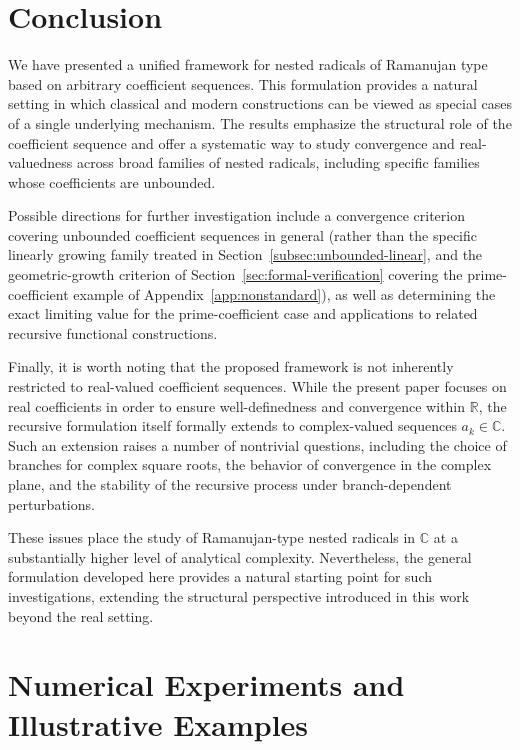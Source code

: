\documentclass[11pt,a4paper]{amsart}
\theoremstyle{plain}
\theoremstyle{definition}
\theoremstyle{remark}
\begin{document}
\section{Conclusion}

We have presented a unified framework for nested radicals of Ramanujan type based on arbitrary coefficient sequences. This formulation provides a natural setting in which classical and modern constructions can be viewed as special cases of a single underlying mechanism. The results emphasize the structural role of the coefficient sequence and offer a systematic way to study convergence and real-valuedness across broad families of nested radicals, including specific families whose coefficients are unbounded.

Possible directions for further investigation include a convergence criterion covering unbounded coefficient sequences in general (rather than the specific linearly growing family treated in Section~\ref{subsec:unbounded-linear}, and the geometric-growth criterion of Section~\ref{sec:formal-verification} covering the prime-coefficient example of Appendix~\ref{app:nonstandard}), as well as determining the exact limiting value for the prime-coefficient case and applications to related recursive functional constructions.

Finally, it is worth noting that the proposed framework is not inherently restricted to real-valued coefficient sequences. While the present paper focuses on real coefficients in order to ensure well-definedness and convergence within $\mathbb{R}$, the recursive formulation itself formally extends to complex-valued sequences $a_k \in \mathbb{C}$. Such an extension raises a number of nontrivial questions, including the choice of branches for complex square roots, the behavior of convergence in the complex plane, and the stability of the recursive process under branch-dependent perturbations.

These issues place the study of Ramanujan-type nested radicals in $\mathbb{C}$ at a substantially higher level of analytical complexity. Nevertheless, the general formulation developed here provides a natural starting point for such investigations, extending the structural perspective introduced in this work beyond the real setting.

\appendix
\section{Numerical Experiments and Illustrative Examples}
\label{app:numerical}
\end{document}
